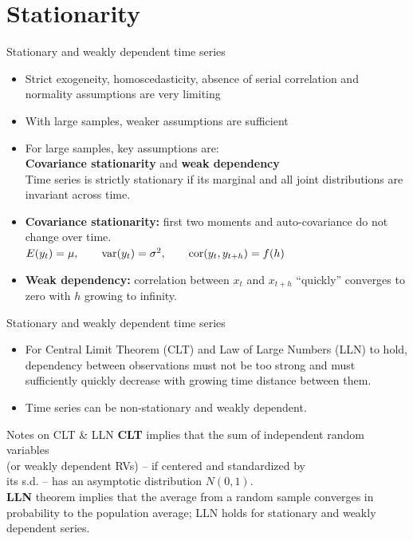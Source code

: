 \documentclass{beamer}
\begin{document}
\section{Stationarity}
\begin{frame}{Stationary and weakly dependent time series}
\begin{itemize}
\item Strict exogeneity, homoscedasticity, absence of serial correlation and normality assumptions are very limiting 
\medskip
\item With large samples, weaker assumptions are sufficient
\medskip
\item For large samples, key assumptions are: \\ \textbf{Covariance stationarity} and \textbf{weak dependency}\\
\medskip
Time series is strictly stationary if its marginal and all joint distributions are invariant across time.
\medskip
\item \textbf{Covariance stationarity:} first two moments and auto-covariance do not change over time.\\
$E(y_t)= \mu,\qquad \textnormal{var}(y_t) = \sigma^2,\qquad \textnormal{cor}(y_t,y_{t+h})=f(h)$
\medskip
\item \textbf{Weak dependency:} correlation between $x_t$ and $x_{t+h}$ ``quickly'' converges to zero with $h$ growing to infinity.
\end{itemize}
\end{frame}
\begin{frame}{Stationary and weakly dependent time series}
\begin{itemize}
\item For Central Limit Theorem (CLT) and Law of Large Numbers (LLN) to hold, dependency between observations must not be too strong and must sufficiently quickly decrease with growing time distance between them.
\medskip
\item Time series can be non-stationary and weakly dependent.
\end{itemize}
\begin{block}{Notes on CLT \& LLN}
\textbf{CLT} implies that the sum of independent random variables \\(or weakly dependent RVs) -- if centered and standardized by \\its s.d. -- has an asymptotic distribution $N(0,1)$.\\ \vspace{0.1cm}
\textbf{LLN} theorem implies that the average from a random sample converges in probability to the population average; LLN holds for stationary and weakly dependent series.
\end{block}
\end{frame}
\end{document}
